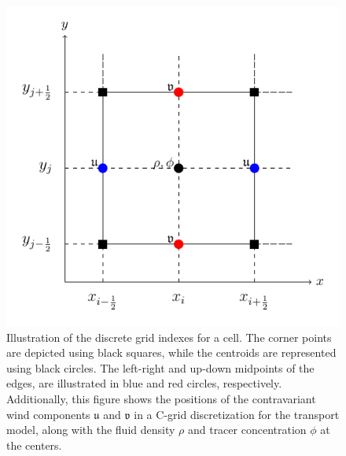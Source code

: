 \documentclass[preprint,12pt]{elsarticle}
\begin{document}
\begin{linenumbers}
\begin{figure}[!htb]
	\centering
	\includegraphics[width=0.5\linewidth]{fv_grid}
	\caption{
	Illustration of the discrete grid indexes for a cell. 
	The corner points are depicted using black squares, while the centroids are represented using black circles. 
	The  left-right and up-down midpoints of the edges,  are illustrated in blue and red circles, respectively.
Additionally, this figure shows the positions of the contravariant wind components $\mathfrak{u}$ and $\mathfrak{v}$ in a C-grid discretization for the transport model, along with the fluid density $\rho$ and tracer concentration $\phi$ at the centers.
	\label{cgrid}}
\end{figure}


\end{linenumbers}
\end{document}
